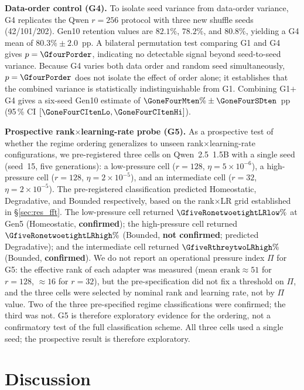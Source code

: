 \documentclass[a4paper,fleqn]{cas-dc}
\newif\ifshowchanges
\newcommand{\rev}[1]{\ifshowchanges{\color{blue}#1}\else{#1}\fi}
\begin{document}
\rev{\textbf{Data-order control (G4).}
To isolate seed variance from data-order variance, G4 replicates the Qwen
$r=256$ protocol with three new shuffle seeds (42/101/202). Gen10 retention
values are $82.1\%$, $78.2\%$, and $80.8\%$, yielding a G4 mean of $\rev{80.3}\%\pm2.0$~pp.
A bilateral permutation test comparing G1 and G4 gives $p=\GfourPorder$, indicating
no detectable signal beyond seed-to-seed variance. Because G4 varies both data
order and random seed simultaneously, $p=\GfourPorder$ does not isolate the
effect of order alone; it establishes that the combined variance is
statistically indistinguishable from G1. Combining G1$+$G4 gives a six-seed
Gen10 estimate of $\GoneFourMten\%\pm\GoneFourSDten$~pp
(95\,\% CI $[\GoneFourCItenLo, \GoneFourCItenHi]$).}

\rev{\textbf{Prospective rank$\times$learning-rate probe (G5).}
As a prospective test of whether the regime ordering generalizes to unseen
rank$\times$learning-rate configurations, we pre-registered three cells on
Qwen~2.5~1.5B with a single seed (seed~15, five generations): a low-pressure
cell ($r=128$, $\eta=5\times10^{-6}$), a high-pressure cell ($r=128$,
$\eta=2\times10^{-5}$), and an intermediate cell ($r=32$, $\eta=2\times10^{-5}$).
The pre-registered classification predicted Homeostatic, Degradative, and
Bounded respectively, based on the rank$\times$LR grid established in
\S\ref{sec:res_fft}.
The low-pressure cell returned $\GfiveRonetwoetightLRlow\%$ at Gen5
(Homeostatic, \textbf{confirmed}); the high-pressure cell returned
$\GfiveRonetwoetightLRhigh\%$ (Bounded, \textbf{not confirmed}; predicted
Degradative); and the intermediate cell returned $\GfiveRthreytwoLRhigh\%$
(Bounded, \textbf{confirmed}).
We do not report an operational pressure index $\Pi$ for G5: the effective rank
of each adapter was measured (mean $\mathrm{erank}\approx51$ for $r=128$,
$\approx16$ for $r=32$), but the pre-specification did not fix a threshold on
$\Pi$, and the three cells were selected by nominal rank and learning rate, not
by $\Pi$ value. \rev{Two of the three pre-specified regime classifications were confirmed; the third was not.} G5 is therefore exploratory evidence for the ordering, not a confirmatory
test of the full classification scheme.
All three cells used a single seed; the prospective result is therefore exploratory.}

\section{Discussion}\label{sec:discussion}
\end{document}
